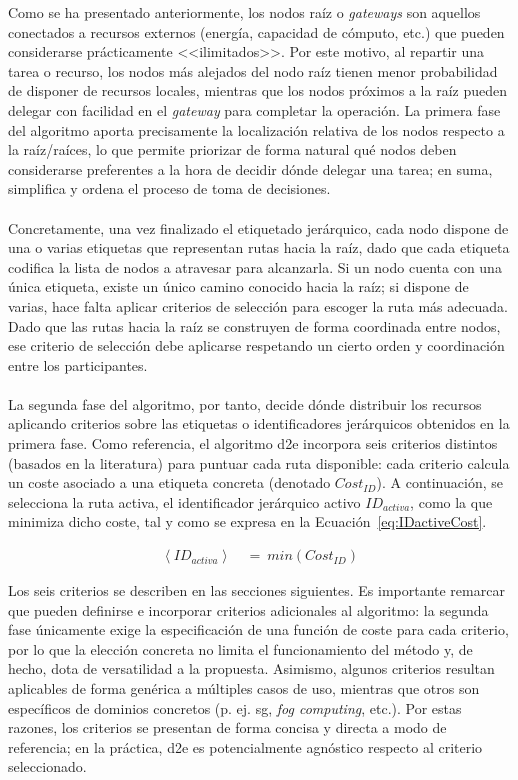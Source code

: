 Como se ha presentado anteriormente, los nodos raíz o \textit{gateways} son aquellos conectados a recursos externos (energía, capacidad de cómputo, etc.) que pueden considerarse prácticamente <<ilimitados>>. Por este motivo, al repartir una tarea o recurso, los nodos más alejados del nodo raíz tienen menor probabilidad de disponer de recursos locales, mientras que los nodos próximos a la raíz pueden delegar con facilidad en el \textit{gateway} para completar la operación. La primera fase del algoritmo aporta precisamente la localización relativa de los nodos respecto a la raíz/raíces, lo que permite priorizar de forma natural qué nodos deben considerarse preferentes a la hora de decidir dónde delegar una tarea; en suma, simplifica y ordena el proceso de toma de decisiones.\\
\\
Concretamente, una vez finalizado el etiquetado jerárquico, cada nodo dispone de una o varias etiquetas que representan rutas hacia la raíz, dado que cada etiqueta codifica la lista de nodos a atravesar para alcanzarla. Si un nodo cuenta con una única etiqueta, existe un único camino conocido hacia la raíz; si dispone de varias, hace falta aplicar criterios de selección para escoger la ruta más adecuada. Dado que las rutas hacia la raíz se construyen de forma coordinada entre nodos, ese criterio de selección debe aplicarse respetando un cierto orden y coordinación entre los participantes.\\
\\
La segunda fase del algoritmo, por tanto, decide dónde distribuir los recursos aplicando criterios sobre las etiquetas o identificadores jerárquicos obtenidos en la primera fase. Como referencia, el algoritmo \gls{d2e} incorpora seis criterios distintos (basados en la literatura) para puntuar cada ruta disponible: cada criterio calcula un coste asociado a una etiqueta concreta (denotado $Cost_{ID}$). A continuación, se selecciona la ruta activa, el identificador jerárquico activo $ID_{activa}$, como la que minimiza dicho coste, tal y como se expresa en la Ecuación~\ref{eq:IDactiveCost}.

\begin{align}\label{eq:IDactiveCost}
     \left \langle ID_{activa} \right \rangle  \: &  = \: min(Cost_{ID})
\end{align}

Los seis criterios se describen en las secciones siguientes. Es importante remarcar que pueden definirse e incorporar criterios adicionales al algoritmo: la segunda fase únicamente exige la especificación de una función de coste para cada criterio, por lo que la elección concreta no limita el funcionamiento del método y, de hecho, dota de versatilidad a la propuesta. Asimismo, algunos criterios resultan aplicables de forma genérica a múltiples casos de uso, mientras que otros son específicos de dominios concretos (p. ej. \gls{sg}, \textit{fog computing}, etc.). Por estas razones, los criterios se presentan de forma concisa y directa a modo de referencia; en la práctica, \gls{d2e} es potencialmente agnóstico respecto al criterio seleccionado.

